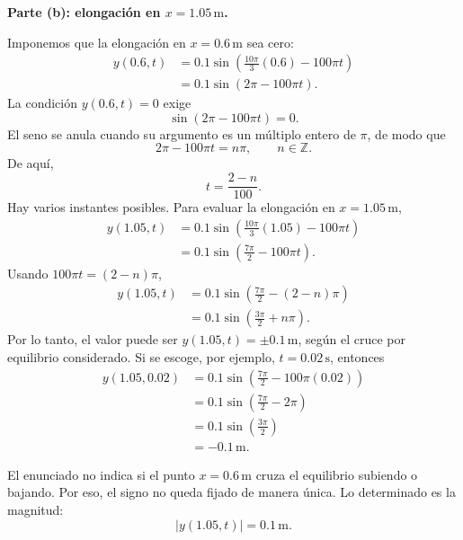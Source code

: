\documentclass[11pt]{article}
\newcommand{\paso}[1]{%
  \par\medskip
  \noindent\textbf{#1}\par
  \vspace{0.1em}%
}
\begin{document}
\paso{Parte (b): elongaci\'on en $x=1.05\,\mathrm{m}$.}
Imponemos que la elongaci\'on en $x=0.6\,\mathrm{m}$ sea cero:
\begin{align*}
    y(0.6,t)
    &=0.1\sin\left(\frac{10\pi}{3}(0.6)-100\pi t\right)\\
    &=0.1\sin(2\pi-100\pi t).
\end{align*}
La condici\'on $y(0.6,t)=0$ exige
\begin{equation*}
    \sin(2\pi-100\pi t)=0.
\end{equation*}
El seno se anula cuando su argumento es un m\'ultiplo entero de $\pi$, de modo que
\begin{equation*}
    2\pi-100\pi t=n\pi,
    \qquad n\in\mathbb{Z}.
\end{equation*}
De aqu\'i,
\begin{equation*}
    t=\frac{2-n}{100}.
\end{equation*}
Hay varios instantes posibles. Para evaluar la elongaci\'on en $x=1.05\,\mathrm{m}$,
\begin{align*}
    y(1.05,t)
    &=0.1\sin\left(\frac{10\pi}{3}(1.05)-100\pi t\right)\\
    &=0.1\sin\left(\frac{7\pi}{2}-100\pi t\right).
\end{align*}
Usando $100\pi t=(2-n)\pi$,
\begin{align*}
    y(1.05,t)
    &=0.1\sin\left(\frac{7\pi}{2}-(2-n)\pi\right)\\
    &=0.1\sin\left(\frac{3\pi}{2}+n\pi\right).
\end{align*}
Por lo tanto, el valor puede ser $y(1.05,t)=\pm0.1\,\mathrm{m}$, seg\'un el cruce por equilibrio considerado. Si se escoge, por ejemplo, $t=0.02\,\mathrm{s}$, entonces
\begin{align*}
    y(1.05,0.02)
    &=0.1\sin\left(\frac{7\pi}{2}-100\pi(0.02)\right)\\
    &=0.1\sin\left(\frac{7\pi}{2}-2\pi\right)\\
    &=0.1\sin\left(\frac{3\pi}{2}\right)\\
    &=-0.1\,\mathrm{m}.
\end{align*}



El enunciado no indica si el punto $x=0.6\,\mathrm{m}$ cruza el equilibrio subiendo o bajando. Por eso, el signo no queda fijado de manera \'unica. Lo determinado es la magnitud:
\begin{equation*}
    \boxed{|y(1.05,t)|=0.1\,\mathrm{m}}.
\end{equation*}
\end{document}
